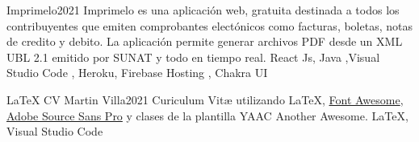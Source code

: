 %


\begin{projects}
	\project
	{Imprimelo}{2021}
	{}
	{Imprimelo es una aplicación web, gratuita destinada a todos los contribuyentes que emiten comprobantes electónicos como facturas, boletas, notas de credito y debito. La aplicación permite generar archivos PDF desde un XML UBL 2.1 emitido por SUNAT y todo en tiempo real.}
	{React Js, Java ,Visual Studio Code , Heroku, Firebase Hosting , Chakra UI}
	
				
	\project
	{LaTeX CV Martin Villa}{2021}
	{ }
	{Curiculum Vitæ utilizando \LaTeX, \href{https://fontawesome.com}{Font Awesome}, \href{https://fonts.google.com/specimen/Source+Sans+Pro}{Adobe Source Sans Pro} y clases de la plantilla YAAC Another Awesome.}
	{\LaTeX, Visual Studio Code}

\end{projects}